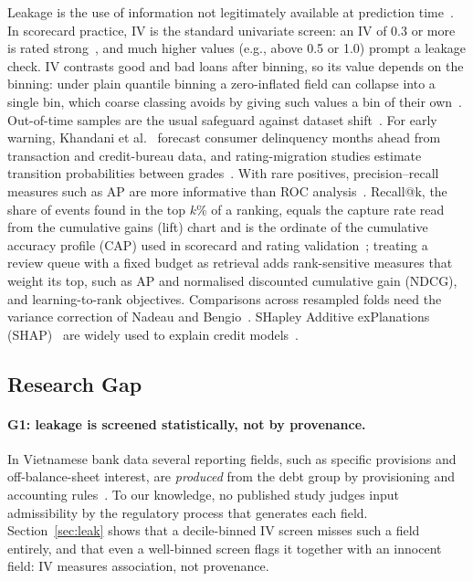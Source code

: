 \documentclass[runningheads]{llncs}
\begin{document}
Leakage is the use of information not legitimately available at prediction time~\cite{kaufman2012leakage}. In scorecard practice, IV is the standard univariate screen: an IV of 0.3 or more is rated strong~\cite{siddiqi2006credit}, and much higher values (e.g., above 0.5 or 1.0) prompt a leakage check. IV contrasts good and bad loans after binning, so its value depends on the binning: under plain quantile binning a zero-inflated field can collapse into a single bin, which coarse classing avoids by giving such values a bin of their own~\cite{siddiqi2006credit}. Out-of-time samples are the usual safeguard against dataset shift~\cite{siddiqi2006credit,morenotorres2012unifying}. For early warning, Khandani et al.~\cite{khandani2010consumer} forecast consumer delinquency months ahead from transaction and credit-bureau data, and rating-migration studies estimate transition probabilities between grades~\cite{lando2002analyzing}. With rare positives, precision--recall measures such as AP are more informative than ROC analysis~\cite{saito2015precision}. Recall@k, the share of events found in the top $k\%$ of a ranking, equals the capture rate read from the cumulative gains (lift) chart and is the ordinate of the cumulative accuracy profile (CAP) used in scorecard and rating validation~\cite{siddiqi2006credit,engelmann2003testing}; treating a review queue with a fixed budget as retrieval adds rank-sensitive measures that weight its top, such as AP and normalised discounted cumulative gain (NDCG), and learning-to-rank objectives. Comparisons across resampled folds need the variance correction of Nadeau and Bengio~\cite{nadeau2003inference}. SHapley Additive exPlanations (SHAP)~\cite{lundberg2017unified,lundberg2020tree} are widely used to explain credit models~\cite{bussmann2021explainable}.

\subsection{Research Gap}
\label{sec:gap}

\paragraph{G1: leakage is screened statistically, not by provenance.} In Vietnamese bank data several reporting fields, such as specific provisions and off-balance-sheet interest, are \emph{produced} from the debt group by provisioning and accounting rules~\cite{gov2024nd86,gov2025nd135}. To our knowledge, no published study judges input admissibility by the regulatory process that generates each field. Section~\ref{sec:leak} shows that a decile-binned IV screen misses such a field entirely, and that even a well-binned screen flags it together with an innocent field: IV measures association, not provenance.
\end{document}
